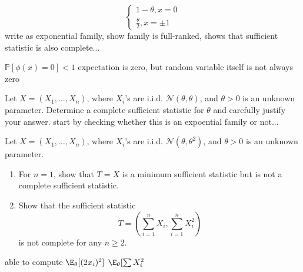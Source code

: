 \documentclass{article}
\begin{document}
 
\[
\begin{cases}
  1 - \theta, x = 0 \\
  \frac{\theta}{2}, x = \pm 1
\end{cases}
\] 
write as exponential family, show family is full-ranked, shows that sufficient statistic is also complete...

$\mathbb{P} [\phi(x) = 0] < 1$ expectation is zero, but random variable itself is not always zero

Let $X = (X_1, \dots, X_n)$, where $X_i$'s are i.i.d. $\mathcal{N}(\theta, \theta)$, and $\theta > 0$ is an unknown parameter. Determine a complete sufficient statistic for $\theta$ and carefully justify your answer.
\solution 
start by checking whether this is an expoential family or not...

Let $X = (X_1, \dots, X_n)$, where $X_i$'s are i.i.d. $\mathcal{N}(\theta, \theta^2)$, and $\theta > 0$ is an unknown parameter.
\begin{enumerate}
  \item For $n=1$, show that $T=X$ is a minimum sufficient statistic but is not a complete sufficient statistic.
  \item Show that the sufficient statistic
    \[
      T = \left( \sum_{i=1}^{n} X_i, \sum_{i=1}^{n} X_{i}^2 \right)
    \]
    is not complete for any $n \geq 2$.
\end{enumerate}
able to compute $\E_\theta[(2x_i)^2]$
$\E_\theta[\sum X_i^2$
\end{document}

